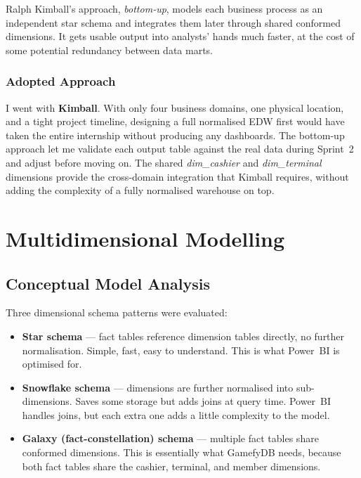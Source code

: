 \documentclass[12pt, a4paper]{report}
\begin{document}
Ralph Kimball's approach, \textit{bottom-up}, models each business process as
an independent star schema and integrates them later through shared conformed
dimensions. It gets usable output into analysts' hands much faster, at the
cost of some potential redundancy between data marts.

\subsubsection{Adopted Approach}

I went with \textbf{Kimball}. With only four business domains, one physical
location, and a tight project timeline, designing a full normalised EDW
first would have taken the entire internship without producing any
dashboards. The bottom-up approach let me validate each output table against
the real data during Sprint~2 and adjust before moving on. The shared
\textit{dim\_cashier} and \textit{dim\_terminal} dimensions provide the
cross-domain integration that Kimball requires, without adding the complexity
of a fully normalised warehouse on top.

\section{Multidimensional Modelling}

\subsection{Conceptual Model Analysis}

Three dimensional schema patterns were evaluated:

\begin{itemize}
  \item \textbf{Star schema} — fact tables reference dimension tables directly,
        no further normalisation. Simple, fast, easy to understand. This is
        what Power~BI is optimised for.

  \item \textbf{Snowflake schema} — dimensions are further normalised into
        sub-dimensions. Saves some storage but adds joins at query time.
        Power~BI handles joins, but each extra one adds a little complexity
        to the model.

  \item \textbf{Galaxy (fact-constellation) schema} — multiple fact tables
        share conformed dimensions. This is essentially what GamefyDB needs,
        because both fact tables share the cashier, terminal, and member
        dimensions.
\end{itemize}
\end{document}
